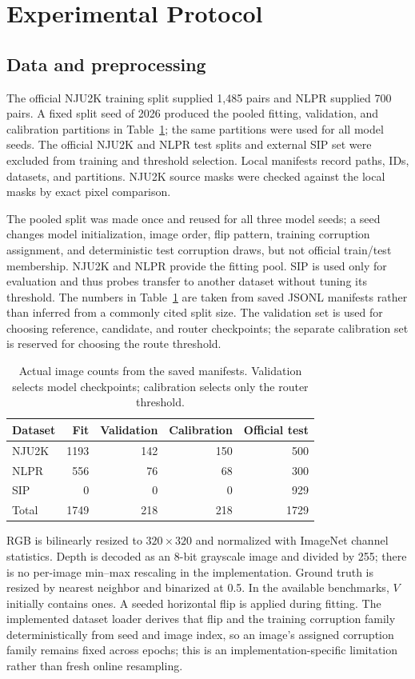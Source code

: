 \documentclass[11pt]{article}
\begin{document}
\section{Experimental Protocol}
\subsection{Data and preprocessing}
The official NJU2K training split supplied 1,485 pairs and NLPR supplied 700 pairs. A fixed split seed of 2026 produced the pooled fitting, validation, and calibration partitions in Table~\ref{tab:data}; the same partitions were used for all model seeds. The official NJU2K and NLPR test splits and external SIP set were excluded from training and threshold selection. Local manifests record paths, IDs, datasets, and partitions. NJU2K source masks were checked against the local masks by exact pixel comparison.

The pooled split was made once and reused for all three model seeds; a seed changes model initialization, image order, flip pattern, training corruption assignment, and deterministic test corruption draws, but not official train/test membership. NJU2K and NLPR provide the fitting pool. SIP is used only for evaluation and thus probes transfer to another dataset without tuning its threshold. The numbers in Table~\ref{tab:data} are taken from saved JSONL manifests rather than inferred from a commonly cited split size. The validation set is used for choosing reference, candidate, and router checkpoints; the separate calibration set is reserved for choosing the route threshold.

\begin{table}[t]\centering\small
\caption{Actual image counts from the saved manifests. Validation selects model checkpoints; calibration selects only the router threshold.}
\label{tab:data}
\begin{tabular}{lrrrr}\toprule Dataset & Fit & Validation & Calibration & Official test\\\midrule
NJU2K & 1193 & 142 & 150 & 500\\
NLPR & 556 & 76 & 68 & 300\\
SIP & 0 & 0 & 0 & 929\\\midrule
Total & 1749 & 218 & 218 & 1729\\\bottomrule\end{tabular}
\end{table}

RGB is bilinearly resized to $320\times320$ and normalized with ImageNet channel statistics. Depth is decoded as an 8-bit grayscale image and divided by 255; there is no per-image min--max rescaling in the implementation. Ground truth is resized by nearest neighbor and binarized at 0.5. In the available benchmarks, $V$ initially contains ones. A seeded horizontal flip is applied during fitting. The implemented dataset loader derives that flip and the training corruption family deterministically from seed and image index, so an image's assigned corruption family remains fixed across epochs; this is an implementation-specific limitation rather than fresh online resampling.
\end{document}
